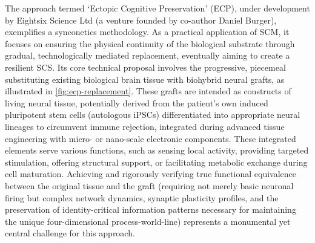 \documentclass[10pt]{article}
\begin{document}
\begin{sloppypar}
  The approach termed ‘Ectopic Cognitive Preservation’ (ECP), under development by Eightsix Science Ltd (a venture founded by co-author Daniel Burger), exemplifies a synconetics methodology. As a practical application of SCM, it focuses on ensuring the physical continuity of the biological substrate through gradual, technologically mediated replacement, eventually aiming to create a resilient SCS. Its core technical proposal involves the progressive, piecemeal substituting existing biological brain tissue with biohybrid neural grafts, as illustrated in \autoref{fig:ecp-replacement}. These grafts are intended as constructs of living neural tissue, potentially derived from the patient’s own induced pluripotent stem cells (autologous iPSCs) differentiated into appropriate neural lineages to circumvent immune rejection, integrated during advanced tissue engineering with micro- or nano-scale electronic components. These integrated elements serve various functions, such as sensing local activity, providing targeted stimulation, offering structural support, or facilitating metabolic exchange during cell maturation. Achieving and rigorously verifying true functional equivalence between the original tissue and the graft (requiring not merely basic neuronal firing but complex network dynamics, synaptic plasticity profiles, and the preservation of identity-critical information patterns necessary for maintaining the unique four-dimensional process-world-line) represents a monumental yet central challenge for this approach.


\end{sloppypar}
\end{document}
